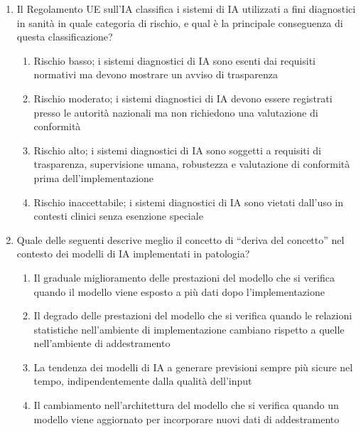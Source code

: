 \begin{enumerate}
    \item \label{ch5:q8} Il Regolamento UE sull'IA classifica i sistemi di IA utilizzati a fini diagnostici in sanità in quale categoria di rischio, e qual è la principale conseguenza di questa classificazione?
    \begin{enumerate}[label=\Alph*.]
        \item Rischio basso; i sistemi diagnostici di IA sono esenti dai requisiti normativi ma devono mostrare un avviso di trasparenza
        \item Rischio moderato; i sistemi diagnostici di IA devono essere registrati presso le autorità nazionali ma non richiedono una valutazione di conformità
        \item Rischio alto; i sistemi diagnostici di IA sono soggetti a requisiti di trasparenza, supervisione umana, robustezza e valutazione di conformità prima dell'implementazione
        \item Rischio inaccettabile; i sistemi diagnostici di IA sono vietati dall'uso in contesti clinici senza esenzione speciale
    \end{enumerate}

    \item \label{ch5:q9} Quale delle seguenti descrive meglio il concetto di ``deriva del concetto'' nel contesto dei modelli di IA implementati in patologia?
    \begin{enumerate}[label=\Alph*.]
        \item Il graduale miglioramento delle prestazioni del modello che si verifica quando il modello viene esposto a più dati dopo l'implementazione
        \item Il degrado delle prestazioni del modello che si verifica quando le relazioni statistiche nell'ambiente di implementazione cambiano rispetto a quelle nell'ambiente di addestramento
        \item La tendenza dei modelli di IA a generare previsioni sempre più sicure nel tempo, indipendentemente dalla qualità dell'input
        \item Il cambiamento nell'architettura del modello che si verifica quando un modello viene aggiornato per incorporare nuovi dati di addestramento
    \end{enumerate}


\end{enumerate}
